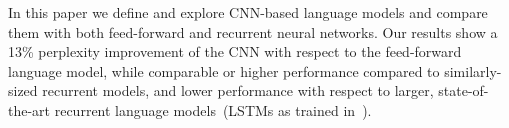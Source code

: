 

In this paper we define and explore CNN-based language models and
compare them with both feed-forward and recurrent neural networks. Our
results show a 13\% perplexity improvement of the CNN with respect to
the feed-forward language model, while comparable or higher performance
compared to similarly-sized recurrent models, and lower performance
with respect to larger, state-of-the-art recurrent language
models~(LSTMs as trained in~).


